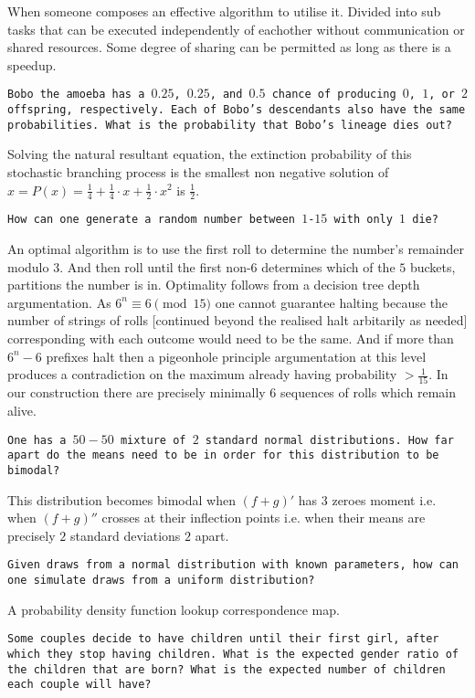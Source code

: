 When someone composes an effective algorithm to utilise it. Divided into sub tasks that can be executed independently of eachother without communication or shared resources. Some degree of sharing can be permitted as long as there is a speedup.

\texttt{Bobo the amoeba has a $0.25$, $0.25$, and $0.5$ chance of producing $0$, $1$, or $2$ offspring, respectively. Each of Bobo's descendants also have the same probabilities. What is the probability that Bobo's lineage dies out?}

Solving the natural resultant equation, the extinction probability of this stochastic branching process is the smallest non negative solution of $x=P(x)=\frac{1}{4}+\frac{1}{4}\cdot x+\frac{1}{2} \cdot x^2$ is $\boxed{\frac{1}{2}}$.

\texttt{How can one generate a random number between $1$-$15$ with only $1$ die?}

An optimal algorithm is to use the first roll to determine the number's remainder modulo $3$. And then roll until the first non-$6$ determines which of the $5$ buckets, partitions the number is in. Optimality follows from a decision tree depth argumentation. As $ 6^n \equiv 6 \pmod{15}$ one cannot guarantee halting because the number of strings of rolls [continued beyond the realised halt arbitarily as needed] corresponding with each outcome would need to be the same. And if more than $6^n-6$ prefixes halt then a pigeonhole principle argumentation at this level produces a contradiction on the maximum already having probability $> \frac{1}{15}$. In our construction there are precisely minimally $6$ sequences of rolls which remain alive.

\texttt{One has a $50-50$ mixture of $2$ standard normal distributions. How far apart do the means need to be in order for this distribution to be bimodal?}

This distribution becomes bimodal when $(f+g)'$ has $3$ zeroes moment i.e. when $(f+g)''$ crosses at their inflection points i.e. when their means are precisely $2$ standard deviations $\boxed{2}$ apart.

\texttt{Given draws from a normal distribution with known parameters, how can one simulate draws from a uniform distribution?}

A probability density function lookup correspondence map.

\texttt{Some couples decide to have children until their first girl, after which they stop having children. What is the expected gender ratio of the children that are born? What is the expected number of children each couple will have?}

